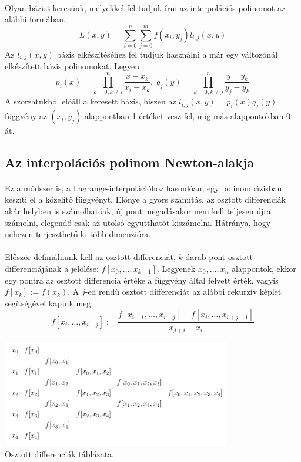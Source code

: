 \documentclass[12pt]{report}
\begin{document}
\paragraph{}
Olyan bázist keresünk, melyekkel fel tudjuk írni az interpolációs polinomot az alábbi formában.
$$
L(x, y) = \sum_{i=0}^{n}\sum_{j=0}^{m}f(x_i, y_j) l_{i, j}(x, y)
$$
Az $l_{i, j}(x,y)$ bázis elkészítéséhez fel tudjuk használni a már egy változónál elkészített bázis polinomokat. Legyen
$$
p_i(x) = \prod_{k = 0, k \neq i}^{n}\frac{x-x_k}{x_i-x_k},\; q_j(y) = \prod_{k = 0, k \neq j}^{n}\frac{y-y_k}{y_j-y_k}
$$
A szorzatukból előáll a keresett bázis, hiszen az $l_{i, j}(x,y) = p_i(x) q_j(y)$ függvény az $(x_i, y_j)$ alappontban 1 értéket vesz fel, míg más alappontokban 0-át.

\subsection{Az interpolációs polinom Newton-alakja}
\paragraph{}
Ez a módszer is, a Lagrange-interpolációhoz hasonlóan, egy polinombázisban készíti el a közelítő függvényt. Előnye a gyors számítás, az osztott differenciák akár helyben is számolhatóak, új pont megadásakor nem kell teljesen újra számolni, elegendő csak az utolsó együtthatót kiszámolni. Hátránya, hogy nehezen terjeszthető ki több dimenzióra.
\paragraph{}
Először definiálnunk kell az osztott differenciát, $k$ darab pont osztott differenciájának a jelölése: $f[x_0, \dots, x_{k-1}]$. Legyenek $x_0, \dots, x_n$ alappontok, ekkor egy pontra az osztott differencia értéke a függvény által felvett érték, vagyis $f[x_k] := f(x_k)$. A $j$-ed rendű osztott differenciát az alábbi rekurzív képlet segítségével kapjuk meg:
$$
f[x_i, \dots, x_{i+j}] := \frac{f[x_{i+1}, \dots, x_{i+j}] - f[x_{i}, \dots, x_{i+j-1}]}{x_{j+i} - x_i}
$$
\begin{center}
\includegraphics[width=10cm]{pics/divide_difference_table}\\
{\footnotesize Osztott differenciák táblázata.}
\end{center}
\end{document}
